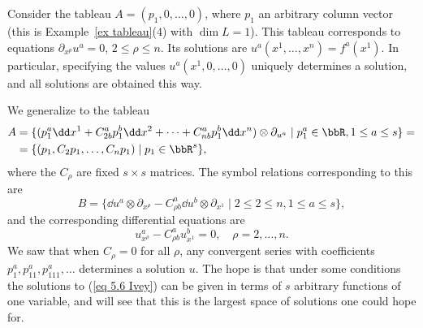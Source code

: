 \begin{example}\label{ex first example Ivey}

Consider the tableau $A=(p_1,0,\ldots,0)$, where $p_1$ an arbitrary column vector (this is Example~\ref{ex tableau}(4) with $\dim L=1$). This tableau corresponds to equations $\partial_{x^p}u^a=0$, $2\leq \rho\leq n$. Its solutions are $u^a(x^1,\ldots,x^n)=f^a(x^1)$. In particular, specifying the values $u^a(x^1,0,\ldots,0)$ uniquely determines a solution, and all solutions are obtained this way.

We generalize to the tableau 
\begin{align}
    A&=\{(p_1^a\dd x^1+C_{2b}^a p_1^b\dd x^2+\cdots +C^a_{nb}p^b_1\dd x^n)\otimes \partial_{u^a}\mid p_1^a\in\bbR,1\leq a\leq s\}= \notag\\
    &= \{(p_1,C_2p_1,\ldots,C_np_1)\mid p_1\in\bbR^s\},\label{eq 5.5 Ivey}
\end{align}
where the $C_\rho$ are fixed $s\times s$ matrices. The symbol relations corresponding to this are 
\[B=\{\dd u^a\otimes \partial_{x^\rho}-C^a_{\rho b}\dd u^b\otimes\partial_{x^1}\mid 2\leq 2\leq n,1\leq a\leq s\},\]
and the corresponding differential equations are 
\[u^a_{x^\rho}-C^a_{\rho b}u^b_{x^1}=0,\quad \rho=2,\ldots,n.\label{eq 5.6 Ivey}\]
We saw that when $C_\rho= 0$ for all $\rho$, any convergent series with coefficients $p_1^a,p_{11}^a,p^a_{111},\ldots $ determines a solution $u$. The hope is that under some conditions the solutions to (\ref{eq 5.6 Ivey}) can be given in terms of $s$ arbitrary functions of one variable, and will see that this is the largest space of solutions one could hope for.


\end{example}
